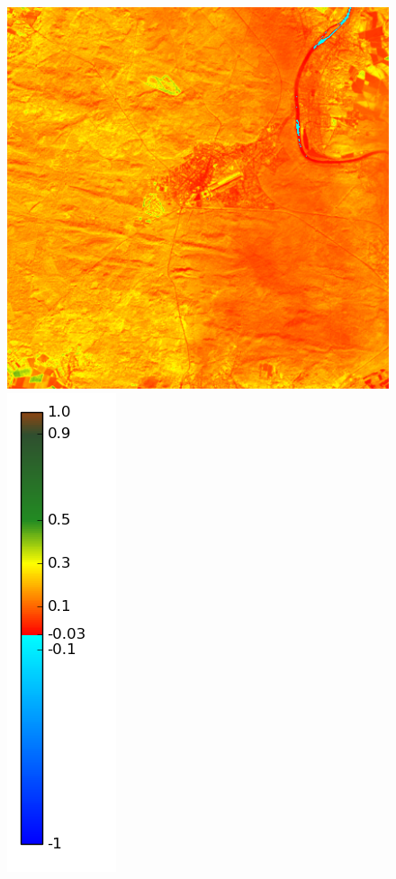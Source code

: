 \documentclass{book}
\begin{document}
\begin{figure}[H]
{\includegraphics[scale=0.25]{images/Fontainebleau/11_ndvi.png}
\includegraphics[scale=0.2]{images/colormap.png}
}
\end{figure}
\end{document}
